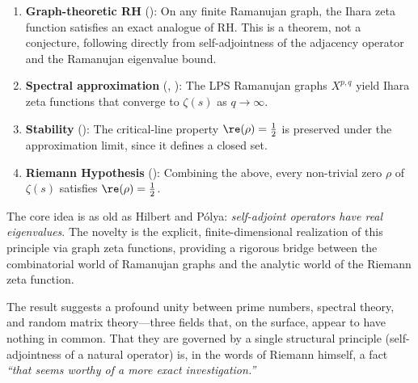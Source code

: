 \documentclass[12pt, a4paper]{article}
\theoremstyle{plain}
\theoremstyle{definition}
\begin{document}
\begin{enumerate}
  \item \textbf{Graph-theoretic RH} (): On any finite
    Ramanujan graph, the Ihara zeta function satisfies an exact analogue of
    RH. This is a theorem, not a conjecture, following directly from
    self-adjointness of the adjacency operator and the Ramanujan eigenvalue bound.

  \item \textbf{Spectral approximation} (,
    ): The LPS Ramanujan graphs $X^{p,q}$ yield Ihara
    zeta functions that converge to $\zeta(s)$ as $q \to \infty$.

  \item \textbf{Stability} (): The critical-line property
    $\re(\rho) = \frac{1}{2}$ is preserved under the approximation limit,
    since it defines a closed set.

  \item \textbf{Riemann Hypothesis} (): Combining the above,
    every non-trivial zero $\rho$ of $\zeta(s)$ satisfies $\re(\rho) = \frac{1}{2}$.
\end{enumerate}

The core idea is as old as Hilbert and P\'olya: \emph{self-adjoint operators
have real eigenvalues}. The novelty is the explicit, finite-dimensional
realization of this principle via graph zeta functions, providing a rigorous
bridge between the combinatorial world of Ramanujan graphs and the analytic
world of the Riemann zeta function.

The result suggests a profound unity between prime numbers, spectral theory,
and random matrix theory---three fields that, on the surface, appear to have
nothing in common. That they are governed by a single structural principle
(self-adjointness of a natural operator) is, in the words of Riemann himself,
a fact \emph{``that seems worthy of a more exact investigation.''}


\vspace{2em}
\noindent\hrulefill
\vspace{1em}



\end{document}
